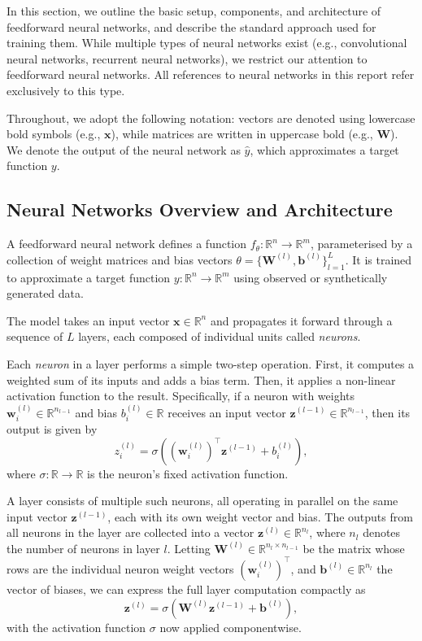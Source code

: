 In this section, we outline the basic setup, components, and architecture of feedforward neural 
networks, and describe the standard approach used for training them. While multiple types of neural 
networks exist (e.g., convolutional neural networks, recurrent neural networks), we restrict our 
attention to feedforward neural networks. All references to neural networks in this report refer 
exclusively to this type.

Throughout, we adopt the following notation: vectors are denoted using lowercase bold symbols 
(e.g., $\mathbf{x}$), while matrices are written in uppercase bold (e.g., $\mathbf{W}$). We denote 
the output of the neural network as $\hat{y}$, which approximates a target function $y$.

\subsection{Neural Networks Overview and Architecture}

A feedforward neural network defines a function \( f_\theta : \mathbb{R}^n \to \mathbb{R}^m \), 
parameterised by a collection of weight matrices and bias vectors \( \theta = \{ \mathbf{W}^{(l)},
\mathbf{b}^{(l)} \}_{l=1}^L \). It is trained to approximate a target function \( y : \mathbb{R}^n \to 
\mathbb{R}^m \) using observed or synthetically generated data.

The model takes an input vector \( \mathbf{x} \in \mathbb{R}^n \) and propagates it forward through a
sequence of $L$ layers, each composed of individual units called \emph{neurons}. 

Each \emph{neuron} in a layer performs a simple two-step operation. First, it computes a weighted
sum of its inputs and adds a bias term. Then, it applies a non-linear activation function to the result.
Specifically, if a neuron with weights \( \mathbf{w}^{(l)}_i \in \mathbb{R}^{n_{l-1}} \) and bias 
\( b^{(l)}_i \in \mathbb{R} \) receives an input vector \( \mathbf{z}^{(l-1)} \in \mathbb{R}^{n_{l-1}} \), 
then its output is given by
\[
    z^{(l)}_i = \sigma\left( (\mathbf{w}^{(l)}_i)^\top \mathbf{z}^{(l-1)} + b^{(l)}_i \right),
\]
where \( \sigma: \mathbb{R} \to \mathbb{R} \) is the neuron's fixed activation function.

A layer consists of multiple such neurons, all operating in parallel on the same input vector 
\( \mathbf{z}^{(l-1)} \), each with its own weight vector and bias. The outputs from all neurons in the
layer are collected into a vector \( \mathbf{z}^{(l)} \in \mathbb{R}^{n_l} \), where \( n_l \) denotes 
the number of neurons in layer \( l \). Letting \( \mathbf{W}^{(l)} \in 
\mathbb{R}^{n_l \times n_{l-1}} \) be the matrix whose rows are the individual neuron weight vectors 
\( (\mathbf{w}^{(l)}_i)^\top \), and \( \mathbf{b}^{(l)} \in \mathbb{R}^{n_l} \) the vector of biases, 
we can express the full layer computation compactly as
\[
    \mathbf{z}^{(l)} = \sigma\left( \mathbf{W}^{(l)} \mathbf{z}^{(l-1)} + \mathbf{b}^{(l)} \right),
\]
with the activation function \( \sigma \) now applied componentwise.

